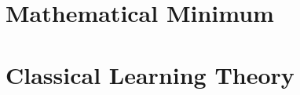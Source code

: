 \documentclass[10pt,oldfontcommands,twoside,titles,dvipsnames,a4paper]{memoir}
\newcommand{\partepigraph}[2]{%
  \gdef\thepartepigraph{\epigraph{#1}{#2}}%
}
\begin{document}

\clearpage

\maketitle
\thispagestyle{empty}
\restoregeometry

\clearpage

\begingroup
\let\MakeUppercase\relax
\tableofcontents
\clearpage
\listoffigures
\clearpage
\renewcommand{\numberline}[1]{#1\hspace{1em}}
\endgroup



\frontmatter



\mainmatter



\clearpage
\partepigraph{ Everything to note of the foundation language of science.}{}
\part{Mathematical Minimum}











\clearpage
\partepigraph{ The classic of the old, the foundation of the past. What are of their uses?}{}
\part{Classical Learning Theory}







%
%
%
%
\end{document}
